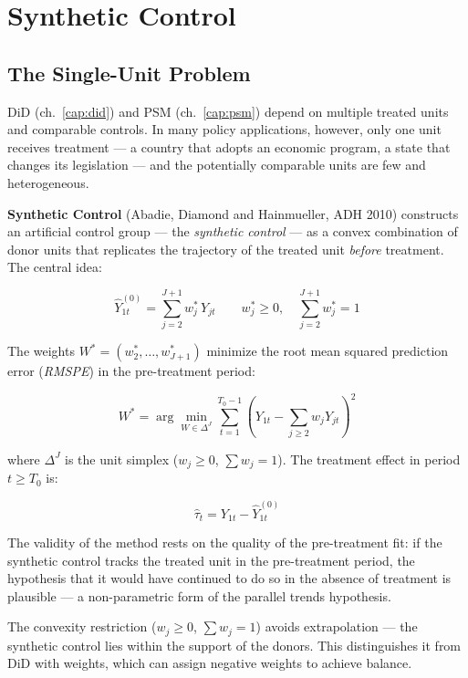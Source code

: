 \chapter{Synthetic Control}
\label{cap:synth}

\section{The Single-Unit Problem}

DiD (ch.~\ref{cap:did}) and PSM (ch.~\ref{cap:psm}) depend on multiple treated
units and comparable controls. In many policy applications, however, only one
unit receives treatment — a country that adopts an economic program, a state
that changes its legislation — and the potentially comparable units are few and
heterogeneous.

\textbf{Synthetic Control} (Abadie, Diamond and Hainmueller, ADH 2010)
constructs an artificial control group — the \emph{synthetic control} — as
a convex combination of donor units that replicates the trajectory of the treated
unit \emph{before} treatment. The central idea:

\[
  \hat{Y}_{1t}^{(0)} = \sum_{j=2}^{J+1} w_j^*\, Y_{jt}
  \qquad
  w_j^* \geq 0,\quad \sum_{j=2}^{J+1} w_j^* = 1
\]

The weights $W^* = (w_2^*,\ldots,w_{J+1}^*)$ minimize the root mean squared
prediction error (\emph{RMSPE}) in the pre-treatment period:

\[
  W^* = \arg\min_{W \in \Delta^J}
  \sum_{t=1}^{T_0-1} \left( Y_{1t} - \sum_{j\geq 2} w_j Y_{jt} \right)^2
\]

where $\Delta^J$ is the unit simplex ($w_j \geq 0$, $\sum w_j = 1$). The treatment
effect in period $t \geq T_0$ is:

\[
  \hat\tau_t = Y_{1t} - \hat{Y}_{1t}^{(0)}
\]

The validity of the method rests on the quality of the pre-treatment fit:
if the synthetic control tracks the treated unit in the pre-treatment period,
the hypothesis that it would have continued to do so in the absence of treatment
is plausible — a non-parametric form of the parallel trends hypothesis.

\begin{nota}
  The convexity restriction ($w_j \geq 0$, $\sum w_j = 1$) avoids
  extrapolation — the synthetic control lies within the support of the donors.
  This distinguishes it from DiD with weights, which can assign negative weights
  to achieve balance.
\end{nota}

